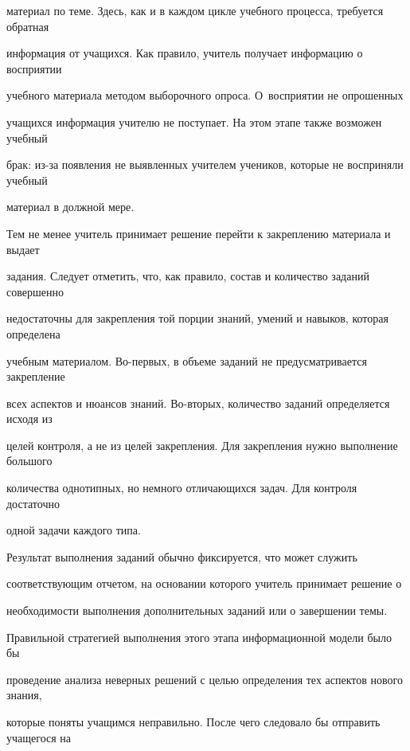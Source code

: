 материал по теме. Здесь, как и в каждом цикле учебного процесса, требуется обратная 


информация от учащихся. Как правило, учитель получает информацию о восприятии 


учебного материала методом выборочного опроса. О~восприятии не опрошенных 


учащихся информация учителю не поступает. На этом этапе также возможен учебный 


брак: из-за появления не выявленных учителем учеников, которые не восприняли учебный 


материал в должной мере.


{





}





Тем не менее учитель принимает решение перейти к закреплению материала и выдает 


задания. Следует отметить, что, как правило, состав и количество заданий совершенно 


недостаточны для закрепления той порции знаний, умений и навыков, которая определена 


учебным материалом. Во-пер\-вых, в объеме заданий не предусматривается закрепление 


всех аспектов и нюансов знаний. Во-вто\-рых, количество заданий определяется исходя из 


целей контроля, а не из целей закрепления. Для закрепления нужно выполнение большого 


количества однотипных, но немного отличающихся задач. Для контроля достаточно 


одной задачи каждого типа.





Результат выполнения заданий обычно фиксируется, что может служить 


соответствующим отчетом, на основании которого учитель принимает решение о 


необходимости выполнения дополнительных заданий или о завершении темы. 


Правильной стратегией выполнения этого этапа информационной модели было бы 


проведение анализа неверных решений с целью определения тех аспектов нового знания, 


которые поняты учащимся неправильно. После чего следовало бы отправить учащегося на 


